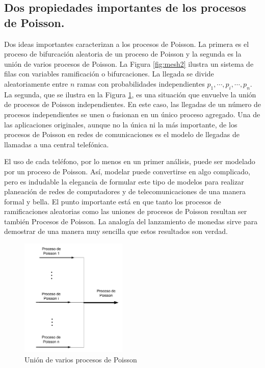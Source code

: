 \subsection{Dos propiedades importantes de los procesos de Poisson.}
Dos ideas importantes caracterizan a los procesos de Poisson. La primera es el proceso de bifurcación aleatoria de un proceso de Poisson y la segunda es la unión de varios procesos de Poisson. La Figura \ref{fig:mesh2} ilustra un sistema de filas con variables ramificación o bifurcaciones. La llegada se divide aleatoriamente entre $ n $ ramas con probabilidades independientes $ p_{1},\cdots,p_{i},\cdots, p_{n} $. La segunda, que se ilustra en la Figura \ref{fig:mesh3}, es una situación que envuelve la unión de procesos de Poisson independientes. En este caso, las llegadas de un número de procesos independientes se unen o fusionan en un único proceso agregado.
Una de las aplicaciones originales, aunque no la única ni la más importante, de los procesos de Poisson en redes de comunicaciones es el modelo de llegadas de llamadas a una central telefónica. 

El uso de cada teléfono, por lo menos en un primer análisis, puede ser modelado por un proceso de Poisson. Así, modelar puede convertirse en algo complicado, pero es indudable la elegancia de formular este tipo de modelos para realizar planeación de redes de computadores y de telecomunicaciones de una manera formal y bella. El punto importante está en que tanto los procesos de ramificaciones aleatorias como las uniones de procesos de Poisson resultan ser también Procesos de Poisson. La analogía del lanzamiento de monedas sirve para demostrar de una manera muy sencilla que estos resultados son verdad.

\begin{figure}[H]
\centering
\includegraphics[width=2in]{chapters/chapter3/figures/Figura1-3:UniondeVariosprocesosdePoisson.png}
\caption[Unión de varios procesos de Poisson]{Unión de varios procesos de Poisson}
\label{fig:mesh3}
\end{figure}

